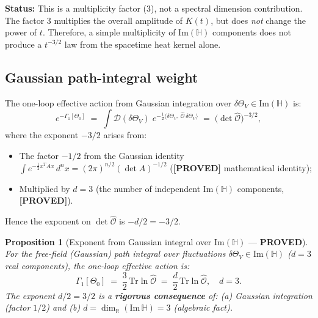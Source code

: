 \documentclass[11pt,a4paper]{article}
\newtheorem{proposition}{Proposition}
\theoremstyle{definition}
\theoremstyle{remark}
\begin{document}
\textbf{Status:} This is a multiplicity factor (3), not a spectral dimension
contribution.
The factor 3 multiplies the overall amplitude of $K(t)$,
but does \emph{not} change the power of $t$.
Therefore, a simple multiplicity of $\mathrm{Im}(\mathbb{H})$ components
does not produce a $t^{-3/2}$ law from the spacetime heat kernel alone.

\subsection{Gaussian path-integral weight}

The one-loop effective action from Gaussian integration over
$\delta\Theta_V \in \mathrm{Im}(\mathbb{H})$ is:
\begin{equation}
  e^{-\Gamma_1[\Theta_0]}
  \;=\; \int \mathcal{D}(\delta\Theta_V)\;
    e^{-\frac{1}{2}\langle\delta\Theta_V,\,\hat{\mathcal{O}}\,\delta\Theta_V\rangle}
  \;=\; \bigl(\det \hat{\mathcal{O}}\bigr)^{-3/2},
  \label{eq:Gaussian_int}
\end{equation}
where the exponent $-3/2$ arises from:
\begin{itemize}
  \item The factor $-1/2$ from the Gaussian identity
    $\int e^{-\frac{1}{2}x^T A x}\,d^n x = (2\pi)^{n/2}(\det A)^{-1/2}$
    (\textbf{[PROVED]} mathematical identity);
  \item Multiplied by $d = 3$ (the number of independent $\mathrm{Im}(\mathbb{H})$
    components, \textbf{[PROVED]}).
\end{itemize}
Hence the exponent on $\det\hat{\mathcal{O}}$ is $-d/2 = -3/2$.

\begin{proposition}[Exponent from Gaussian integral over $\mathrm{Im}(\mathbb{H})$
  — \textbf{PROVED}]
\label{prop:gaussian_exponent}
  For the free-field (Gaussian) path integral over fluctuations
  $\delta\Theta_V \in \mathrm{Im}(\mathbb{H})$ ($d = 3$ real components),
  the one-loop effective action is:
  \begin{equation}
    \Gamma_1[\Theta_0]
    \;=\; \frac{3}{2}\,\mathrm{Tr}\ln\hat{\mathcal{O}}
    \;=\; \frac{d}{2}\,\mathrm{Tr}\ln\hat{\mathcal{O}},
    \quad d = 3.
    \label{eq:Gamma1}
  \end{equation}
  The exponent $d/2 = 3/2$ is a \textbf{rigorous consequence} of:
  (a) Gaussian integration (factor $1/2$) and
  (b) $d = \dim_\mathbb{R}(\mathrm{Im}\,\mathbb{H}) = 3$ (algebraic fact).
\end{proposition}
\end{document}
